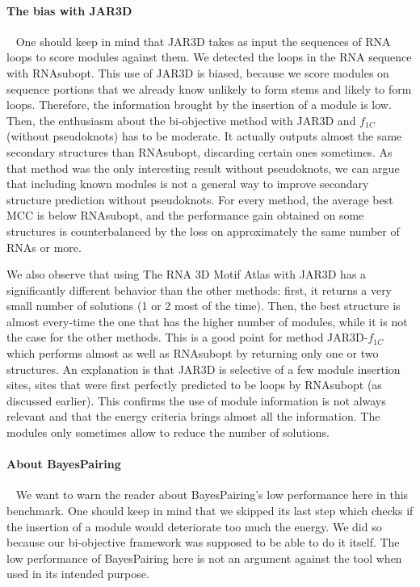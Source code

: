 \documentclass{bioinfo}
\begin{document}
\paragraph{The bias with JAR3D} ~ One should keep in mind that JAR3D takes as input the sequences of RNA loops to score modules against them. We detected the loops in the RNA sequence with RNAsubopt. This use of JAR3D is biased, because we score modules on sequence portions that we already know unlikely to form stems and likely to form loops. Therefore, the information brought by the insertion of a module is low. 
Then, the enthusiasm about the bi-objective method with JAR3D and $f_{1C}$ (without pseudoknots) has to be moderate. It actually outputs almost the same secondary structures than RNAsubopt, discarding certain ones sometimes. As that method was the only interesting result without pseudoknots, we can argue that including known modules is not a general way to improve secondary structure prediction without pseudoknots. For every method, the average best MCC is below RNAsubopt, and the performance gain obtained on some structures is counterbalanced by the loss on approximately the same number of RNAs or more.

We also observe that using The RNA 3D Motif Atlas with JAR3D has a significantly different behavior than the other methods: first, it returns a very small number of solutions (1 or 2 most of the time). Then, the best structure is almost every-time the one that has the higher number of modules, while it is not the case for the other methods. This is a good point for method JAR3D-$f_{1C}$ which performs almost as well as RNAsubopt by returning only one or two structures. An explanation is that JAR3D is selective of a few module insertion sites, sites that were first perfectly predicted to be loops by RNAsubopt (as discussed earlier). This confirms the use of module information is not always relevant and that the energy criteria brings almost all the information. The modules only sometimes allow to reduce the number of solutions.

\paragraph{About BayesPairing} ~ We want to warn the reader about BayesPairing's low performance here in this benchmark. One should keep in mind that we skipped its last step which checks if the insertion of a module would deteriorate too much the energy. We did so because our bi-objective framework was supposed to be able to do it itself. The low performance of BayesPairing here is not an argument against the tool when used in its intended purpose.
\end{document}
